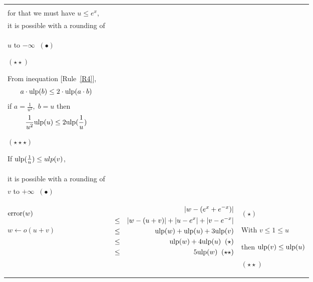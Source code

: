 \documentclass[12pt]{amsart}
\def\ulp{{\rm ulp}}
\newcommand{\U}[1]{\quad \mbox{[Rule~\ref{#1}]}}
\begin{document}
\begin{center}
\begin{tabular}{l l l}
\begin{minipage}{7.5cm}
\end{minipage} &
\begin{minipage}{6cm}

$(\star)$

With $\frac{1}{e^x} \leq \frac{1}{u}$,\\ 
for that we must have $u \leq e^x$,\\
it is possible with a rounding of\\
$u$ to $-\infty \;\; (\bullet)$

$(\star\star)$

From inequation \U{R4}, 
\[   a \cdot \ulp(b) \leq 2 \cdot \ulp(a \cdot b)\]
if $a =\frac{1}{u^2},\;b = u$ then  
\[ \frac{1}{u^2} \ulp(u)  \leq 2 \ulp(\frac{1}{u})\]

$(\star\star\star)$

If $\ulp(\frac{1}{u}) \leq ulp(v)$,\\
it is possible with a rounding of \\
$v$ to $+\infty \;\; (\bullet)$\\



\end{minipage}\\%
\begin{minipage}{2.5cm}
${\textnormal{error}}(w)$


$w \leftarrow o(u+v) $
\end{minipage} &
\begin{minipage}{7.5cm}



\begin{eqnarray}\nonumber
  &&|w-(e^{x}+e^{-x})| \\\nonumber
  &       \leq&  |w - (u+v)|+|u - e^x|+|v - e^{-x}|\\\nonumber
  &       \leq& \ulp(w) + \ulp(u) + 3\ulp(v)\\\nonumber
  &       \leq& \ulp(w) + 4\ulp(u)\;\;(\star)\\\nonumber
  &       \leq& 5\ulp(w)\;\;(\star\star)\\\nonumber
\end{eqnarray}


\end{minipage} &
\begin{minipage}{6cm}

$(\star)$

With $v \leq 1\leq u$ 

then $\ulp(v) \leq \ulp(u)$

$(\star\star)$


\end{minipage}
\end{tabular}
\end{center}
\end{document}
